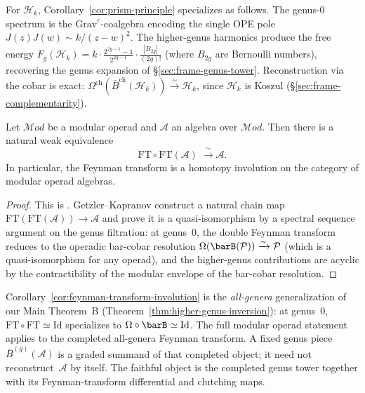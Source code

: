 \begin{example}
For $\mathcal{H}_k$, Corollary~\ref{cor:prism-principle} specializes as follows. The genus-$0$ spectrum is the $\mathrm{Grav}^c$-coalgebra encoding the single OPE pole $J(z)J(w) \sim k/(z-w)^2$. The higher-genus harmonics produce the free energy $F_g(\mathcal{H}_k) = k \cdot \frac{2^{2g-1}-1}{2^{2g-1}} \cdot \frac{|B_{2g}|}{(2g)!}$ (where $B_{2g}$ are Bernoulli numbers), recovering the genus expansion of \S\ref{sec:frame-genus-tower}. Reconstruction via the cobar is exact: $\Omega^{\mathrm{ch}}(\bar{B}^{\mathrm{ch}}(\mathcal{H}_k)) \xrightarrow{\sim} \mathcal{H}_k$, since $\mathcal{H}_k$ is Koszul (\S\ref{sec:frame-complementarity}).
\end{example}

\begin{corollary}%
\label{cor:feynman-transform-involution}
Let $\mathcal{M}od$ be a modular operad and $\mathcal{A}$ an algebra
over $\mathcal{M}od$. Then there is a natural weak equivalence
\begin{equation}\label{eq:ft-involution}
\mathrm{FT} \circ \mathrm{FT}(\mathcal{A})
\;\xrightarrow{\;\sim\;}
\mathcal{A}.
\end{equation}
In particular, the Feynman transform is a homotopy involution on
the category of modular operad algebras.
\end{corollary}

\begin{proof}
This is \cite[Theorem~5.4]{GeK98}. Getzler--Kapranov construct
a natural chain map
$\mathrm{FT}(\mathrm{FT}(\mathcal{A})) \to \mathcal{A}$
and prove it is a quasi-isomorphism by a spectral sequence argument
on the genus filtration: at genus~$0$, the double Feynman transform
reduces to the operadic bar-cobar resolution
$\Omega(\barB(\mathcal{P})) \xrightarrow{\sim} \mathcal{P}$
(which is a quasi-isomorphism for any operad), and the higher-genus
contributions are acyclic by the contractibility of the modular
envelope of the bar-cobar resolution.
\end{proof}

\begin{remark}\label{rem:ft-vs-bar-cobar}
Corollary~\ref{cor:feynman-transform-involution} is the
\emph{all-genera} generalization of our Main Theorem~B
(Theorem~\ref{thm:higher-genus-inversion}): at genus~$0$,
$\mathrm{FT} \circ \mathrm{FT} \simeq \mathrm{Id}$ specializes
to $\Omega \circ \barB \simeq \mathrm{Id}$. The full modular
operad statement applies to the completed all-genera Feynman
transform.  A fixed genus piece
$\bar{B}^{(g)}(\mathcal{A})$ is a graded summand of that completed
object; it need not reconstruct~$\mathcal{A}$ by itself.  The
faithful object is the completed genus tower together with its
Feynman-transform differential and clutching maps.
\end{remark}

